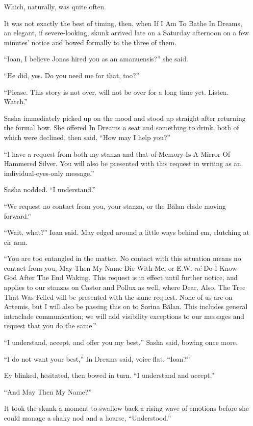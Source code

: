 Which, naturally, was quite often.

It was not exactly the best of timing, then, when If I Am To Bathe In Dreams, an elegant, if severe-looking, skunk arrived late on a Saturday afternoon on a few minutes' notice and bowed formally to the three of them.

``Ioan, I believe Jonas hired you as an amanuensis?'' she said.

``He did, yes. Do you need me for that, too?''

``Please. This story is not over, will not be over for a long time yet. Listen. Watch.''

Sasha immediately picked up on the mood and stood up straight after returning the formal bow. She offered In Dreams a seat and something to drink, both of which were declined, then said, ``How may I help you?''

``I have a request from both my stanza and that of Memory Is A Mirror Of Hammered Silver. You will also be presented with this request in writing as an individual-eyes-only message.''

Sasha nodded. ``I understand.''

``We request no contact from you, your stanza, or the Bălan clade moving forward.''

``Wait, what?'' Ioan said. May edged around a little ways behind em, clutching at eir arm.

``You are too entangled in the matter. No contact with this situation means no contact from you, May Then My Name Die With Me, or E.W. \emph{né} Do I Know God After The End Waking. This request is in effect until further notice, and applies to our stanzas on Castor and Pollux as well, where Dear, Also, The Tree That Was Felled will be presented with the same request. None of us are on Artemis, but I will also be passing this on to Sorina Bălan. This includes general intraclade communication; we will add visibility exceptions to our messages and request that you do the same.''

``I understand, accept, and offer you my best,'' Sasha said, bowing once more.

``I do not want your best,'' In Dreams said, voice flat. ``Ioan?''

Ey blinked, hesitated, then bowed in turn. ``I understand and accept.''

``And May Then My Name?''

It took the skunk a moment to swallow back a rising wave of emotions before she could manage a shaky nod and a hoarse, ``Understood.''

